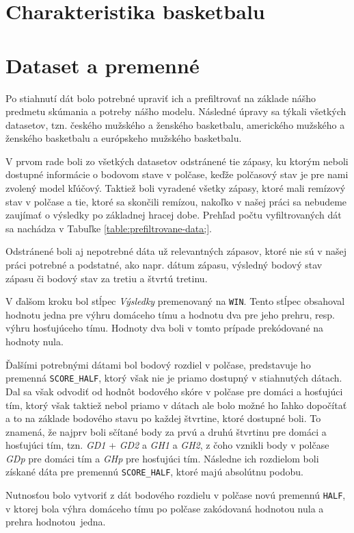 \documentclass[
  digital, %
  oneside, %
  notable,   %
  lof,     %
  lot,     %
]{fithesis3}
\begin{document}
	\chapter{Charakteristika basketbalu}
	
	\chapter{Dataset a premenné}
	Po stiahnutí dát bolo potrebné upraviť ich a prefiltrovať na základe nášho predmetu skúmania a potreby nášho modelu. Následné úpravy sa týkali všetkých datasetov, tzn. českého mužského a ženského basketbalu, amerického mužského a ženského basketbalu a európskeho mužského basketbalu.
	
	V prvom rade boli zo všetkých datasetov odstránené tie zápasy, ku ktorým neboli dostupné informácie o bodovom stave v polčase, keďže polčasový stav je pre nami zvolený model kľúčový. Taktiež boli vyradené všetky zápasy, ktoré mali remízový stav v polčase a tie, ktoré sa skončili remízou, nakoľko v našej práci sa nebudeme zaujímať o výsledky po základnej hracej dobe. Prehľad počtu vyfiltrovaných dát sa nachádza v Tabuľke \ref{table:prefiltrovane-data;}.
	
	Odstránené boli aj nepotrebné dáta už relevantných zápasov, ktoré nie sú v našej práci potrebné a podstatné, ako napr. dátum zápasu, výsledný bodový stav zápasu či bodový stav za tretiu a štvrtú tretinu.
	
	V ďalšom kroku bol stĺpec \textit{Výsledky} premenovaný na \texttt{WIN}. Tento stĺpec obsahoval hodnotu jedna pre výhru domáceho tímu a hodnotu dva pre jeho prehru, resp. výhru hosťujúceho tímu. Hodnoty dva boli v tomto prípade prekódované na hodnoty nula.
	
	Ďalšími potrebnými dátami bol bodový rozdiel v polčase, predstavuje ho premenná \texttt{SCORE\_HALF}, ktorý však nie je priamo dostupný v stiahnutých dátach. Dal sa však odvodiť od hodnôt bodového skóre v polčase pre domáci a hosťujúci tím, ktorý však taktiež nebol priamo v dátach ale bolo možné ho  ľahko dopočítať a to na základe bodového stavu po každej štvrtine, ktoré dostupné boli. To znamená, že najprv boli sčítané body za prvú a druhú štvrtinu pre domáci a hosťujúci tím, tzn. \textit{GD1} + \textit{GD2} a \textit{GH1} a \textit{GH2}, z čoho vznikli body v polčase \textit{GDp} pre domáci tím a \textit{GHp} pre hosťujúci tím. Následne ich rozdielom boli získané dáta pre premennú \texttt{SCORE\_HALF}, ktoré majú absolútnu podobu. 
	
	Nutnosťou bolo vytvoriť z dát bodového rozdielu v polčase novú premennú \texttt{HALF}, v ktorej bola výhra domáceho tímu po polčase zakódovaná hodnotou nula a prehra hodnotou~jedna. 
	
\end{document}
